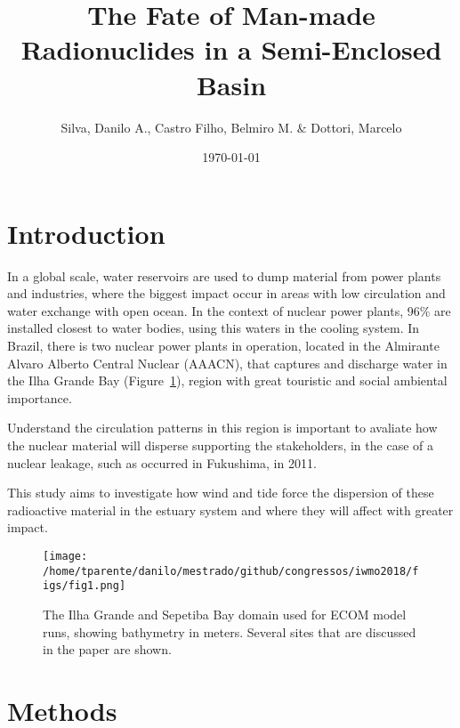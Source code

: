 \documentclass[final]{beamer}
\title
[24$^{o}$ Simpósio Internacional de Iniciação Científica da USP] %
{ %
The Fate of Man-made Radionuclides in a Semi-Enclosed Basin
}
\author{ Silva, Danilo A.\inst{1}, Castro Filho, Belmiro M.\inst{2} $\&$ Dottori, Marcelo\inst{3}
}
\institute[Instituto Oceanográfico - Universidade de São Paulo]
{
Instituto Oceanográfico da Universidade de São Paulo (IOUSP)\\ [0.2ex]
\inst{1} danilo2.silva@usp.br; \inst{2} bmcastro@usp.br; \inst{3} mdottori@usp.br
}
\date{\today}
\begin{document}
\begin{frame}
\begin{multicols}{2}

\section{Introduction}

In a global scale, water reservoirs are used to dump material from power plants and
industries, where the biggest impact occur in areas with low circulation and water
exchange with open ocean. In the context of nuclear power plants, 96$\%$ are installed
closest to water bodies, using this waters in the cooling system. In Brazil, there is
two nuclear power plants in operation, located in the Almirante Alvaro Alberto 
Central Nuclear (AAACN), that captures and discharge water in the Ilha Grande Bay
(Figure~\ref{fig:areaestudo}), region with great touristic and social ambiental importance.

Understand the circulation patterns in this region is important to avaliate how the nuclear
material will disperse supporting the stakeholders, in the case of a nuclear leakage, such
as occurred in Fukushima, in 2011.

This study aims to investigate how wind and tide force the dispersion of these radioactive material in the
estuary system and where they will affect with greater impact.

\vspace{.1in}
\begin{figure}
\centering
\texttt{[image: /home/tparente/danilo/mestrado/github/congressos/iwmo2018/figs/fig1.png]}
\vspace{.1in}
\caption{The Ilha Grande and Sepetiba Bay domain used for ECOM model runs, showing bathymetry in meters. Several sites that are discussed in the paper are shown.}
\label{fig:areaestudo}
\end{figure}
\vspace{-.5in}
\section{Methods}


\end{multicols}
\end{frame}
\end{document}
